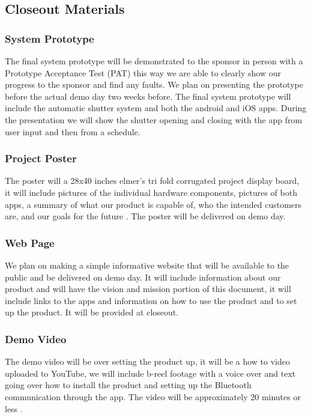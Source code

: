 \subsection{Closeout Materials}
\subsubsection{System Prototype}
The final system prototype will be demonstrated to the sponsor in person with a Prototype Acceptance Test (PAT) this way we are able to clearly show our progress to the sponsor and find any faults. We plan on presenting the prototype before the actual demo day two weeks before. The final system prototype will include the automatic shutter system and both the android and iOS apps. During the presentation we will show the shutter opening and closing with the app from user input and then from a schedule.

\subsubsection{Project Poster}
The poster will a 28x40 inches elmer's tri fold corrugated project display board, it will include pictures of the individual hardware components, pictures of both apps, a summary of what our product is capable of, who the intended customers are, and our goals for the future . The poster will be delivered on demo day. 

\subsubsection{Web Page}
We plan on making a simple informative website that will be available to the public and be delivered on demo day. It will include information about our product and will have the vision and mission portion of this document, it will include links to the apps and information on how to use the product and to set up the product. It will be provided at closeout.


\subsubsection{Demo Video}
The demo video will be over setting the product up, it will be a how to video uploaded to YouTube, we will include b-reel footage with a voice over and text going over how to install the product and setting up the Bluetooth communication through the app. The video will be approximately 20 minutes or less .

